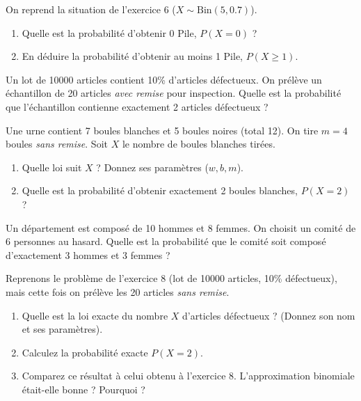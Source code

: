 \begin{exercicebox}
On reprend la situation de l'exercice 6 ($X \sim \text{Bin}(5, 0.7)$).
\begin{enumerate}
    \item Quelle est la probabilité d'obtenir 0 Pile, $P(X=0)$ ?
    \item En déduire la probabilité d'obtenir au moins 1 Pile, $P(X \ge 1)$.
\end{enumerate}
\end{exercicebox}

\begin{exercicebox}
Un lot de 10000 articles contient 10\% d'articles défectueux. On prélève un échantillon de 20 articles \textit{avec remise} pour inspection.
Quelle est la probabilité que l'échantillon contienne exactement 2 articles défectueux ?
\end{exercicebox}


\begin{exercicebox}
Une urne contient 7 boules blanches et 5 boules noires (total 12). On tire $m=4$ boules \textit{sans remise}. Soit $X$ le nombre de boules blanches tirées.
\begin{enumerate}
    \item Quelle loi suit $X$ ? Donnez ses paramètres ($w, b, m$).
    \item Quelle est la probabilité d'obtenir exactement 2 boules blanches, $P(X=2)$ ?
\end{enumerate}
\end{exercicebox}

\begin{exercicebox}
Un département est composé de 10 hommes et 8 femmes. On choisit un comité de 6 personnes au hasard.
Quelle est la probabilité que le comité soit composé d'exactement 3 hommes et 3 femmes ?
\end{exercicebox}

\begin{exercicebox}
Reprenons le problème de l'exercice 8 (lot de 10000 articles, 10\% défectueux), mais cette fois on prélève les 20 articles \textit{sans remise}.
\begin{enumerate}
    \item Quelle est la loi exacte du nombre $X$ d'articles défectueux ? (Donnez son nom et ses paramètres).
    \item Calculez la probabilité exacte $P(X=2)$.
    \item Comparez ce résultat à celui obtenu à l'exercice 8. L'approximation binomiale était-elle bonne ? Pourquoi ?
\end{enumerate}
\end{exercicebox}


